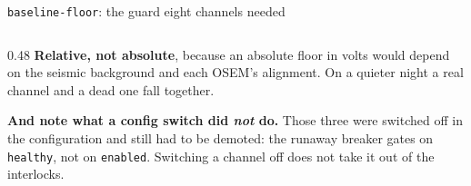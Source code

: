 \documentclass[aspectratio=169]{beamer}
\begin{document}
\begin{frame}{\texttt{baseline-floor}: the guard eight channels needed}
\begin{columns}[T]
\begin{column}{0.48\textwidth}
      \vspace{1.5mm}
      \textbf{Relative, not absolute}, because an absolute floor in volts would
      depend on the seismic background and each OSEM's alignment. On a quieter
      night a real channel and a dead one fall together.

      \vspace{1.5mm}
      \textbf{And note what a config switch did \emph{not} do.} Those three were
      switched off in the configuration and still had to be demoted: the runaway
      breaker gates on \texttt{healthy}, not on \texttt{enabled}.
      Switching a channel off does not take it out of the interlocks.
    \end{column}
  \end{columns}
\end{frame}
\end{document}
